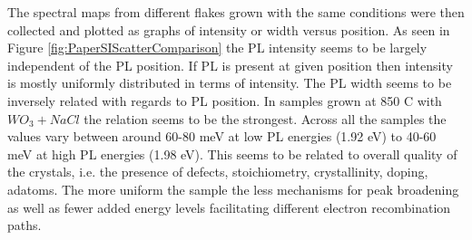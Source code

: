 The spectral maps from different flakes grown with the same conditions were then collected and plotted as graphs of intensity or width versus position. As seen in Figure \ref{fig:PaperSIScatterComparison} the PL intensity seems to be largely independent of the PL position. If PL is present at given position then intensity is mostly uniformly distributed in terms of intensity. The PL width seems to be inversely related with regards to PL position. In samples grown at 850 {\degree}C with $WO_3 + NaCl$ the relation seems to be the strongest. Across all the samples the values vary between around 60-80 meV at low PL energies (1.92 eV) to 40-60 meV at high PL energies (1.98 eV). This seems to be related to overall quality of the crystals, i.e. the presence of defects, stoichiometry, crystallinity, doping, adatoms. The more uniform the sample the less mechanisms for peak broadening as well as fewer added energy levels facilitating different electron recombination paths.

